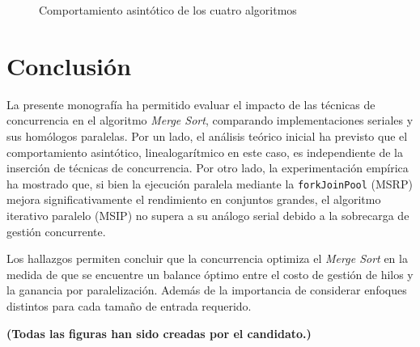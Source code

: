 \documentclass[titlepage]{article}
\begin{document}
\begin{figure}[H]
\begin{minipage}{0.49\textwidth}
	\end{minipage}
	\hfill
	\begin{minipage}{0.49\textwidth}
		\centering
		
	\end{minipage}
	\caption{Comportamiento asintótico de los cuatro algoritmos}
	\label{fig:comparacionCuatro}
\end{figure}

\section{Conclusión}%
La presente monografía ha permitido evaluar el impacto de las técnicas de concurrencia en el algoritmo \textit{Merge Sort}, comparando implementaciones seriales y sus homólogos paralelas. Por un lado, el análisis teórico inicial ha previsto que el comportamiento asintótico, linealogarítmico en este caso, es independiente de la inserción de técnicas de concurrencia. Por otro lado, la experimentación empírica ha mostrado que, si bien la ejecución paralela mediante la \lstinline|forkJoinPool| (MSRP) mejora significativamente el rendimiento en conjuntos grandes, el algoritmo iterativo paralelo (MSIP) no supera a su análogo serial debido a la sobrecarga de gestión concurrente. 

Los hallazgos permiten concluir que la concurrencia optimiza el \textit{Merge Sort} en la medida de que se encuentre un balance óptimo entre el costo de gestión de hilos y la ganancia por paralelización. Además de la importancia de considerar enfoques distintos para cada tamaño de entrada requerido.


\newpage

\listoffigures
\listoftables

\vspace{1cm}
\textbf{(Todas las figuras han sido creadas por el candidato.)}
\end{document}
